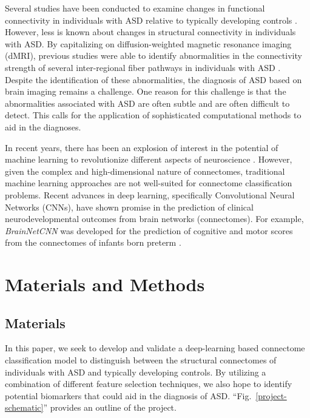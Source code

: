 \documentclass[conference]{IEEEtran}
\begin{document}
Several studies have been conducted to examine changes in functional connectivity in 
individuals with ASD relative to typically developing controls \cite{Lau.2019, Williams.2013}. 
However, less is known about changes in structural connectivity in individuals with ASD. 
By capitalizing on diffusion-weighted magnetic resonance imaging (dMRI), previous studies 
were able to identify abnormalities in the connectivity strength of several inter-regional 
fiber pathways in individuals with ASD \cite{dAlBbis.2018}. Despite the identification of 
these abnormalities, the diagnosis of ASD based on brain imaging remains a challenge. 
One reason for this challenge is that the abnormalities associated with ASD are often 
subtle and are often difficult to detect. This calls for the application of sophisticated 
computational methods to aid in the diagnoses.

In recent years, there has been an explosion of interest in the potential of machine 
learning to revolutionize different aspects of neuroscience \cite{Abos.2017,Vogt.2018}. 
However, given the complex and high-dimensional nature of connectomes, traditional 
machine learning approaches are not well-suited for connectome classification problems. 
Recent advances in deep learning, specifically Convolutional Neural Networks (CNNs), have 
shown promise in the prediction of clinical neurodevelopmental outcomes from brain 
networks (connectomes). For example, \textit{BrainNetCNN} was developed for the 
prediction of cognitive and motor scores from the connectomes of infants born preterm 
\cite{Kawahara.2017}.


\section{Materials and Methods}

    \subsection{Materials}

    In this paper, we seek to develop and validate a deep-learning based connectome 
    classification model to distinguish between the structural connectomes of individuals 
    with ASD and typically developing controls. By utilizing a combination of different 
    feature selection techniques, we also hope to identify potential biomarkers that 
    could aid in the diagnosis of ASD. ``Fig.~\ref{project-schematic}'' provides an 
    outline of the project. 
\end{document}
